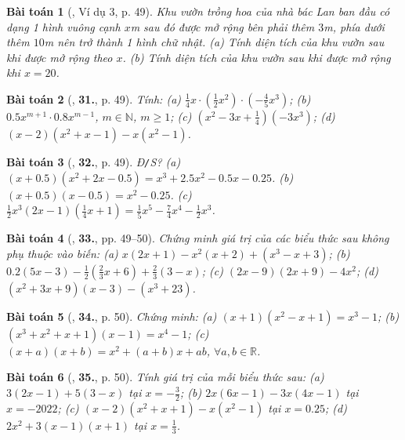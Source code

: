 \documentclass{article}
\numberwithin{equation}{section}
\newtheorem{baitoan}{Bài toán}
\begin{document}
\begin{baitoan}[\cite{SBT_Toan_7_Canh_Dieu_tap_2}, Ví dụ 3, p. 49]
	Khu vườn trồng hoa của nhà bác Lan ban đầu có dạng 1 hình vuông cạnh $x$\emph{m} sau đó được mở rộng bên phải thêm $3$\emph{m}, phía dưới thêm $10$\emph{m} nên trở thành 1 hình chữ nhật. (a) Tính diện tích của khu vườn sau khi được mở rộng theo $x$. (b) Tính diện tích của khu vườn sau khi được mở rộng khi $x = 20$.
\end{baitoan}

\begin{baitoan}[\cite{SBT_Toan_7_Canh_Dieu_tap_2}, \textbf{31.}, p. 49]
	Tính: (a) $\frac{1}{4}x\cdot\left(\frac{1}{2}x^2\right)\cdot\left(-\frac{4}{5}x^3\right)$; (b) $0.5x^{m+1}\cdot0.8x^{m-1}$, $m\in\mathbb{N}$, $m\ge1$; (c) $\left(x^2 - 3x + \frac{1}{4}\right)(-3x^3)$; (d) $(x - 2)(x^2 + x - 1) - x(x^2 - 1)$.
\end{baitoan}

\begin{baitoan}[\cite{SBT_Toan_7_Canh_Dieu_tap_2}, \textbf{32.}, p. 49]
	\emph{Đ\texttt{/}S?} (a) $(x + 0.5)(x^2 + 2x - 0.5) = x^3 + 2.5x^2 - 0.5x - 0.25$. (b) $(x + 0.5)(x - 0.5) = x^2  - 0.25$. (c) $\frac{1}{2}x^3(2x - 1)\left(\frac{1}{4}x + 1\right) = \frac{1}{5}x^5 - \frac{7}{4}x^4 - \frac{1}{2}x^3$.
\end{baitoan}

\begin{baitoan}[\cite{SBT_Toan_7_Canh_Dieu_tap_2}, \textbf{33.}, pp. 49--50]
	Chứng minh giá trị của các biểu thức sau không phụ thuộc vào biến: (a) $x(2x + 1) - x^2(x + 2) + (x^3 - x + 3)$; (b) $0.2(5x - 3) - \frac{1}{2}\left(\frac{2}{3}x + 6\right) + \frac{2}{3}(3 - x)$; (c) $(2x - 9)(2x + 9) - 4x^2$; (d) $(x^2 + 3x + 9)(x - 3) - (x^3 + 23)$.
\end{baitoan}

\begin{baitoan}[\cite{SBT_Toan_7_Canh_Dieu_tap_2}, \textbf{34.}, p. 50]
	Chứng minh: (a) $(x + 1)(x^2 - x + 1) = x^3 - 1$; (b) $(x^3 + x^2 + x + 1)(x - 1) = x^4 - 1$; (c) $(x + a)(x + b) = x^2 + (a + b)x + ab$, $\forall a,b\in\mathbb{R}$.
\end{baitoan}

\begin{baitoan}[\cite{SBT_Toan_7_Canh_Dieu_tap_2}, \textbf{35.}, p. 50]
	Tính giá trị của mỗi biểu thức sau: (a) $3(2x - 1) + 5(3 - x)$ tại $x = -\frac{3}{2}$; (b) $2x(6x - 1) - 3x(4x - 1)$ tại $x = -2022$; (c) $(x - 2)(x^2 + x + 1) - x(x^2 - 1)$ tại $x = 0.25$; (d) $2x^2 + 3(x - 1)(x + 1)$ tại $x = \frac{1}{3}$.
\end{baitoan}
\end{document}
